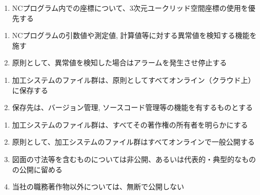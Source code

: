 \begin{enumerate}[label=\alph*)]
\item NCプログラム内での座標について、3次元ユークリッド空間座標の使用を優先する
\end{enumerate}



\begin{enumerate}[label*=\alph*)]
\item NCプログラムの引数値や測定値, 計算値等に対する異常値を検知する機能を施す
\item 原則として、異常値を検知した場合はアラームを発生させ停止する
\end{enumerate}



\begin{enumerate}[label*=\alph*)]
\item 加工システムのファイル群は、原則としてすべてオンライン（クラウド上）に保存する
\item 保存先は、バージョン管理, ソースコード管理等の機能を有するものとする
\end{enumerate}



\clearpage
\begin{enumerate}[label*=\alph*)]
\item 加工システムのファイル群は、すべてその著作権の所有者を明らかにする
\item 原則として、加工システムのファイル群はすべてオンラインで一般公開する
\item 図面の寸法等を含むものについては非公開、あるいは代表的・典型的なものの公開に留める
\item 当社の職務著作物以外については、無断で公開しない
\end{enumerate}


